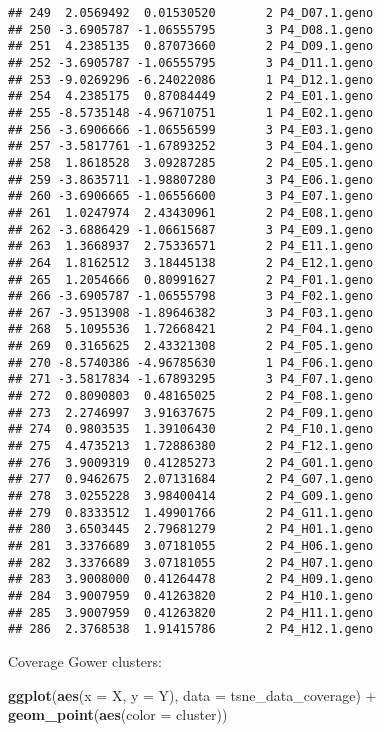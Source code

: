 \documentclass[]{article}
\newenvironment{Shaded}{\begin{snugshade}}{\end{snugshade}}
\newcommand{\KeywordTok}[1]{\textcolor[rgb]{0.13,0.29,0.53}{\textbf{{#1}}}}
\newcommand{\DataTypeTok}[1]{\textcolor[rgb]{0.13,0.29,0.53}{{#1}}}
\newcommand{\StringTok}[1]{\textcolor[rgb]{0.31,0.60,0.02}{{#1}}}
\newcommand{\NormalTok}[1]{{#1}}
\begin{document}
\begin{verbatim}
## 249  2.0569492  0.01530520       2 P4_D07.1.geno
## 250 -3.6905787 -1.06555795       3 P4_D08.1.geno
## 251  4.2385135  0.87073660       2 P4_D09.1.geno
## 252 -3.6905787 -1.06555795       3 P4_D11.1.geno
## 253 -9.0269296 -6.24022086       1 P4_D12.1.geno
## 254  4.2385175  0.87084449       2 P4_E01.1.geno
## 255 -8.5735148 -4.96710751       1 P4_E02.1.geno
## 256 -3.6906666 -1.06556599       3 P4_E03.1.geno
## 257 -3.5817761 -1.67893252       3 P4_E04.1.geno
## 258  1.8618528  3.09287285       2 P4_E05.1.geno
## 259 -3.8635711 -1.98807280       3 P4_E06.1.geno
## 260 -3.6906665 -1.06556600       3 P4_E07.1.geno
## 261  1.0247974  2.43430961       2 P4_E08.1.geno
## 262 -3.6886429 -1.06615687       3 P4_E09.1.geno
## 263  1.3668937  2.75336571       2 P4_E11.1.geno
## 264  1.8162512  3.18445138       2 P4_E12.1.geno
## 265  1.2054666  0.80991627       2 P4_F01.1.geno
## 266 -3.6905787 -1.06555798       3 P4_F02.1.geno
## 267 -3.9513908 -1.89646382       3 P4_F03.1.geno
## 268  5.1095536  1.72668421       2 P4_F04.1.geno
## 269  0.3165625  2.43321308       2 P4_F05.1.geno
## 270 -8.5740386 -4.96785630       1 P4_F06.1.geno
## 271 -3.5817834 -1.67893295       3 P4_F07.1.geno
## 272  0.8090803  0.48165025       2 P4_F08.1.geno
## 273  2.2746997  3.91637675       2 P4_F09.1.geno
## 274  0.9803535  1.39106430       2 P4_F10.1.geno
## 275  4.4735213  1.72886380       2 P4_F12.1.geno
## 276  3.9009319  0.41285273       2 P4_G01.1.geno
## 277  0.9462675  2.07131684       2 P4_G07.1.geno
## 278  3.0255228  3.98400414       2 P4_G09.1.geno
## 279  0.8333512  1.49901766       2 P4_G11.1.geno
## 280  3.6503445  2.79681279       2 P4_H01.1.geno
## 281  3.3376689  3.07181055       2 P4_H06.1.geno
## 282  3.3376689  3.07181055       2 P4_H07.1.geno
## 283  3.9008000  0.41264478       2 P4_H09.1.geno
## 284  3.9007959  0.41263820       2 P4_H10.1.geno
## 285  3.9007959  0.41263820       2 P4_H11.1.geno
## 286  2.3768538  1.91415786       2 P4_H12.1.geno
\end{verbatim}

Coverage Gower clusters:

\begin{Shaded}
\begin{Highlighting}[]
\KeywordTok{ggplot}\NormalTok{(}\KeywordTok{aes}\NormalTok{(}\DataTypeTok{x =} \NormalTok{X, }\DataTypeTok{y =} \NormalTok{Y), }\DataTypeTok{data =} \NormalTok{tsne_data_coverage) +}
\StringTok{  }\KeywordTok{geom_point}\NormalTok{(}\KeywordTok{aes}\NormalTok{(}\DataTypeTok{color =} \NormalTok{cluster))}
\end{Highlighting}
\end{Shaded}
\end{document}
